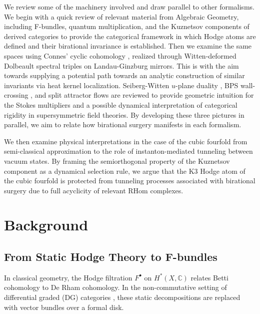\documentclass[12pt,reqno]{amsart}
\theoremstyle{remark} \newtheorem{remark}[theorem]{Remark}
\begin{document}
We review some of the machinery involved and draw parallel to other formalisms.  We begin with a quick review of relevant material from
Algebraic Geometry, including F-bundles, quantum
      multiplication, and the Kuznetsov components of derived
      categories to provide the categorical framework in which Hodge
      atoms are defined and their birational invariance is
      established.  Then we examine the same spaces using
      Connes' cyclic
      cohomology \cite{Connes1994}, realized through Witten-deformed
      Dolbeault spectral triples on Landau-Ginzburg mirrors.
      This is with the aim towards supplying a potential path towards
      an analytic construction of similar invariants via
      heat kernel localization.
      Seiberg-Witten $u$-plane
      duality \cite{Seiberg1994}, BPS wall-crossing \cite{GMN2013},
      and split attractor flows \cite{Denef2000} are reviewed
      to provide geometric
      intuition for the Stokes multipliers and a possible dynamical
      interpretation of categorical rigidity in supersymmetric
      field theories.
      By developing these three pictures in parallel, we aim to relate how
      birational surgery manifests in each formalism.

      We then examine physical interpretations in the case of the cubic fourfold
from semi-classical approximation
to the role of instanton-mediated tunneling between vacuum
states.
By framing the semiorthogonal property of the Kuznetsov
component as a dynamical selection rule, we argue that the K3 Hodge
atom of the cubic fourfold
is protected from tunneling processes associated with birational
surgery due to full acyclicity of relevant RHom complexes.

\section{Background}

\subsection{From Static Hodge Theory to F-bundles}
In classical geometry, the Hodge filtration $F^\bullet$ on $H^*(X,
\mathbb{C})$ relates Betti cohomology to De Rham cohomology. In the
non-commutative setting of differential graded (DG) categories
\cite{Keller2006}, these static decompositions are replaced
with vector bundles over a formal disk.
\end{document}
